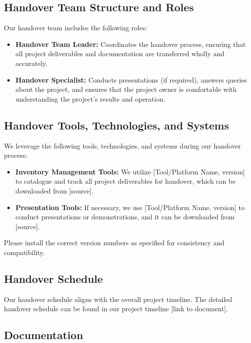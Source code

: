\documentclass[10pt]{projectdoc}
\begin{document}
\subsection{Handover Team Structure and Roles}

Our handover team includes the following roles:

\begin{itemize}
\item \textbf{Handover Team Leader:} Coordinates the handover process, ensuring that all project deliverables and documentation are transferred wholly and accurately.
\item \textbf{Handover Specialist:} Conducts presentations (if required), answers queries about the project, and ensures that the project owner is comfortable with understanding the project's results and operation.
\end{itemize}

\subsection{Handover Tools, Technologies, and Systems}

We leverage the following tools, technologies, and systems during our handover process:

\begin{itemize}
\item \textbf{Inventory Management Tools:} We utilize [Tool/Platform Name, version] to catalogue and track all project deliverables for handover, which can be downloaded from [source].
\item \textbf{Presentation Tools:} If necessary, we use [Tool/Platform Name, version] to conduct presentations or demonstrations, and it can be downloaded from [source].
\end{itemize}

Please install the correct version numbers as specified for consistency and compatibility.

\subsection{Handover Schedule}

Our handover schedule aligns with the overall project timeline. The detailed handover schedule can be found in our project timeline [link to document].

\subsection{Documentation}
\end{document}
